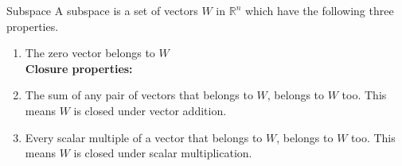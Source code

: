 \begin{definition}{Subspace}
A subspace is a set of vectors $W$ in $\mathbb{R}^n$ which have the following three properties. 

\begin{enumerate}
    \item The zero vector belongs to $W$\\
    \textbf{Closure properties:}
    \item The sum of any pair of vectors that belongs to $W$, belongs to $W$ too. This means $W$ is closed under vector addition.
    \item Every scalar multiple of a vector that belongs to $W$, belongs to $W$ too. This means $W$ is closed under scalar multiplication.
\end{enumerate}
\cite[227]{LiAl}
\label{exa:SubspaceDef}
\end{definition}
